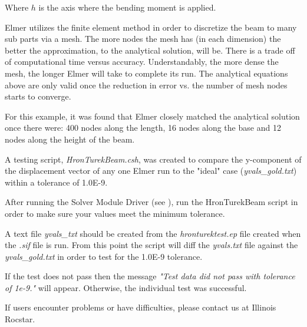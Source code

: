 Where $ h $ is the axis where the bending moment is applied. 


Elmer utilizes the finite element method in order to discretize the beam to many sub parts via a mesh. The more nodes the mesh has (in each dimension) the better the approximation, to the analytical solution, will be. There is a trade off of computational time versus accuracy. Understandably, the more dense the mesh, the longer Elmer will take to complete its run. The analytical equations above are only valid once the reduction in error vs. the number of mesh nodes starts to converge.

For this example, it was found that Elmer closely matched the analytical solution once there were: 400 nodes along the length, 16 nodes along the base and 12 nodes along the height of the beam.

A testing script, \textit{HronTurekBeam.csh}, was created to compare the  y-component of the displacement vector of any one Elmer run to the "ideal" case (\textit{yvals\_gold.txt}) within a tolerance of 1.0E-9.

After running the Solver Module Driver (see ), run the HronTurekBeam script in order to make sure your values meet the minimum tolerance. 


A text file \textit{yvals\_txt} should be created from the \textit{hronturektest.ep} file created when the \textit{.sif} file is run. From this point the script will diff the \textit{yvals.txt} file against the \textit{yvals\_gold.txt} in order to test for the 1.0E-9 tolerance.

If the test does not pass then the message \textit{"Test data did not pass with tolerance of 1e-9."} will appear. Otherwise, the individual test was successful.
    

If users encounter problems or have difficulties, please contact us at Illinois Rocstar.

